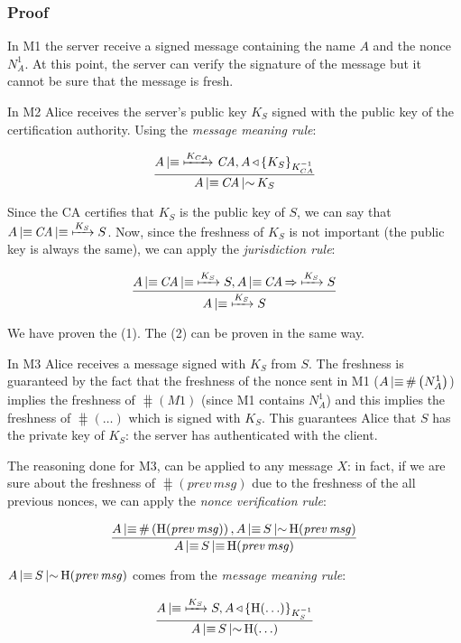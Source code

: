 \subsubsection{Proof}

In M1 the server receive a signed message containing the name \(A\) and the
nonce \(N_A^1\). At this point, the server can verify the signature of the
message but it cannot be sure that the message is fresh.

In M2 Alice receives the server's public key \(K_S\) signed with the public
key of the certification authority. Using the \emph{message meaning rule}:

\[
	\frac{A \believes \pubkey{K_{CA}} \mathit{CA}, A \sees \sign{K_S}{K_{CA}}}%
	{A \believes \mathit{CA} \oncesaid K_S}
\]

Since the CA certifies that \(K_S\) is the public key of \(S\), we can say
that \(A \operatorname{\mid\equiv} \mathit{CA} \operatorname{\mid\equiv} \xmapsto{K_S} S\). Now, since the
freshness of \(K_S\) is not important (the public key is always the same),
we can apply the \emph{jurisdiction rule}:

\[
	\frac{A \operatorname{\mid\equiv} \mathit{CA} \operatorname{\mid\equiv} \xmapsto{K_S} S, A \operatorname{\mid\equiv} \mathit{CA} \operatorname{\Rightarrow} \xmapsto{K_S} S}
	{A \operatorname{\mid\equiv} \xmapsto{K_S} S}
\]

We have proven the (1). The (2) can be proven in the same way.

In M3 Alice receives a message signed with \(K_S\) from \(S\). The
freshness is guaranteed by the fact that the freshness of the nonce sent in M1
(\(A \operatorname{\mid\equiv} \#\left(N_A^1\right)\)) implies the freshness of \(\hash(M1)\) (since M1
contains \(N_A^1\)) and this implies the freshness of \(\hash(\ldots)\) which is
signed with \(K_S\). This guarantees Alice that \(S\) has the private key of
\(K_S\): the server has authenticated with the client.

The reasoning done for M3, can be applied to any message \(X\): in fact, if we
are sure about the freshness of \(\hash(\mathit{prev\,msg})\) due to the
freshness of the all previous nonces, we can apply the \emph{nonce verification
rule}:

\[
	\frac{A \operatorname{\mid\equiv} \#\left(\operatorname{H}(\mathit{prev\,msg})\right), A \operatorname{\mid\equiv} S \operatorname{\mid\sim} \operatorname{H}(\mathit{prev\,msg})}
	{A \operatorname{\mid\equiv} S \operatorname{\mid\equiv} \operatorname{H}(\mathit{prev\,msg})}
\]

\(A \operatorname{\mid\equiv} S \operatorname{\mid\sim} \operatorname{H}(\mathit{prev\,msg})\) comes from the
\emph{message meaning rule}:

\[
	\frac{A \operatorname{\mid\equiv} \xmapsto{K_S} S, A \operatorname{\triangleleft} {\left\{\operatorname{H}(\ldots)\right\}}_{K_S^{-1}}}
	{A \operatorname{\mid\equiv} S \operatorname{\mid\sim} \operatorname{H}(\ldots)}
\]

